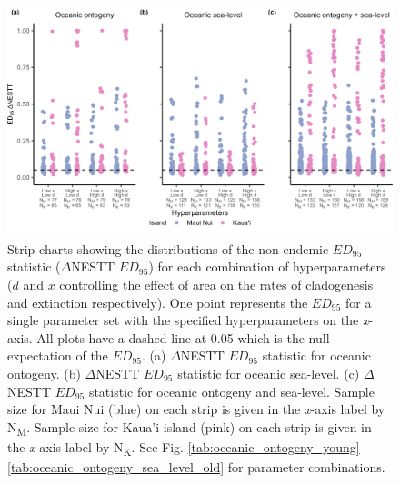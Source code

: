 \begin{figure}
    \centering
    \includegraphics[width=\textwidth]{JBI-21-0508_FigS3.png}
    \caption{Strip charts showing the distributions of the non-endemic $ED_{95}$ statistic ($\Delta$NESTT $ED_{95}$) for each combination of hyperparameters ($d$ and $x$ controlling the effect of area on the rates of cladogenesis and extinction respectively). One point represents the $ED_{95}$ for a single parameter set with the specified hyperparameters on the \textit{x}-axis. All plots have a dashed line at 0.05 which is the null expectation of the $ED_{95}$. (a) $\Delta$NESTT $ED_{95}$ statistic for oceanic ontogeny. (b) $\Delta$NESTT $ED_{95}$ statistic for oceanic sea-level. (c) $\Delta$NESTT $ED_{95}$ statistic for oceanic ontogeny and sea-level. Sample size for Maui Nui (blue) on each strip is given in the \textit{x}-axis label by N\textsubscript{M}. Sample size for Kaua'i island (pink) on each strip is given in the \textit{x}-axis label by N\textsubscript{K}. See Fig. \ref{tab:oceanic_ontogeny_young}-\ref{tab:oceanic_ontogeny_sea_level_old} for parameter combinations.}
    \label{fig:Hyperparameters_nonendemic}
\end{figure}
 
